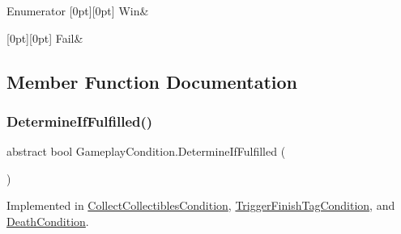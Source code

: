 \begin{DoxyEnumFields}{Enumerator}
[0pt][0pt]{}\mbox{\label{class_gameplay_condition_af7549fe9ce5328062dab831d05ca9702a119eac47719cc9be7b99124712e229da}} 
Win&\\
\hline

[0pt][0pt]{}\mbox{\label{class_gameplay_condition_af7549fe9ce5328062dab831d05ca9702aceaa0734f0b3c738120c67344d8f3ec1}} 
Fail&\\
\hline

\end{DoxyEnumFields}


\subsection{Member Function Documentation}
\mbox{\label{class_gameplay_condition_a7788119247b929ae43f7c134767e589e}} 
\subsubsection{\texorpdfstring{Determine\+If\+Fulfilled()}{DetermineIfFulfilled()}}
{\footnotesize\ttfamily abstract bool Gameplay\+Condition.\+Determine\+If\+Fulfilled (\begin{DoxyParamCaption}{ }\end{DoxyParamCaption})\hspace{0.3cm}{\ttfamily [pure virtual]}}



Implemented in \mbox{\hyperlink{class_collect_collectibles_condition_af61a1a03224942635451d7d63a886adf}{Collect\+Collectibles\+Condition}}, \mbox{\hyperlink{class_trigger_finish_tag_condition_a2093b9932e1b90d51e5f6c25caeec514}{Trigger\+Finish\+Tag\+Condition}}, and \mbox{\hyperlink{class_death_condition_a175822d80f10b8ec4ccadca271197530}{Death\+Condition}}.

